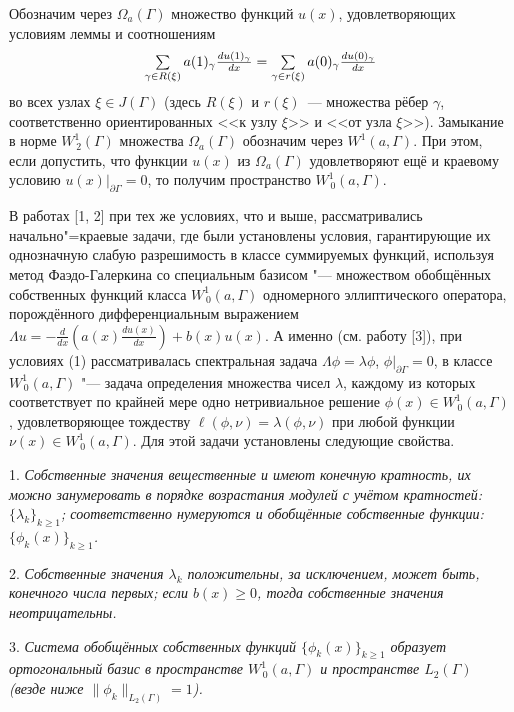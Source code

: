 Обозначим через $\Omega_a(\Gamma)$ множество функций $u(x)$, удовлетворяющих условиям леммы и соотношениям
\[
{{\begin{array}{*{20}c}
\sum\limits_{\gamma\in R(\xi)}a(1)_\gamma\frac{du (1)_\gamma}{dx}
 =\sum\limits_{\gamma\in r(\xi)}a(0)_\gamma\frac{du (0)_\gamma}{dx}
 \end{array} }}
\]
во всех узлах $\xi\in J(\Gamma)$ (здесь $R(\xi)$ и $r(\xi)$~--- множества рёбер $\gamma$, соответственно ориентированных <<к узлу $\xi$>> и <<от узла $\xi$>>). Замыкание в норме $W^1_{\,2}(\Gamma)$ множества $\Omega_a(\Gamma)$  обозначим через $W^1(a,\Gamma)$. При этом, если допустить, что функции $u(x)$ из $\Omega_a(\Gamma)$ удовлетворяют ещё и краевому условию $u(x)|_{\partial\Gamma}=0$, то получим пространство $W^1_{\,0}(a,\Gamma)$.


В работах [1, 2] при тех же условиях, что и выше, рассматривались начально"=краевые задачи, где были установлены условия, гарантирующие их однозначную слабую разрешимость в классе суммируемых функций, используя метод Фаэдо-Галеркина со специальным базисом "--- множеством обобщённых собственных функций класса $W_{\,0}^{1}(a,\Gamma)$ одномерного эллиптического оператора, порождённого дифференциальным выражением ${\Lambda}u=-\frac{d }{d x }\left(a(x)\frac{d u(x)}{d x}\right)+b(x)u(x)$. А именно (см. работу [3]), при условиях (1) рассматривалась спектральная задача ${\Lambda}\phi=\lambda \phi$, $\phi|_{\partial\Gamma}=0$, в классе $W_{\,0}^{1}(a,\Gamma)$ "--- задача определения множества чисел $\lambda$, каждому из которых соответствует по крайней мере одно нетривиальное решение $\phi(x)\in W_{\,0}^{1}(a,\Gamma)$, удовлетворяющее тождеству $\ell(\phi,\nu)=\lambda (\phi,\nu)$  при любой функции $\nu(x)\in W_{\,0}^{1}(a,\Gamma)$. Для этой задачи установлены следующие свойства.

1. \emph{Собственные значения  вещественные и имеют конечную кратность, их можно занумеровать в порядке возрастания модулей с учётом кратностей: $\{\lambda_k\}_{k\geqslant 1}$; соответственно нумеруются и обобщённые собственные функции: $\{\phi_k(x)\}_{k\geqslant 1}$.}

2. \emph{Собственные значения $\lambda_k$ положительны, за исключением, может быть, конечного числа первых; если $b(x)\geqslant0$, тогда собственные значения неотрицательны.}

3. \emph{Система обобщённых собственных функций $\{\phi_k(x)\}_{k\geqslant 1}$ образует ортогональный базис в пространстве $W_{\,0}^{1}(a,\Gamma)$ и пространстве $L_2(\Gamma)$ (везде ниже $\|\phi_k\|_{L_2(\Gamma)}=1$). }

